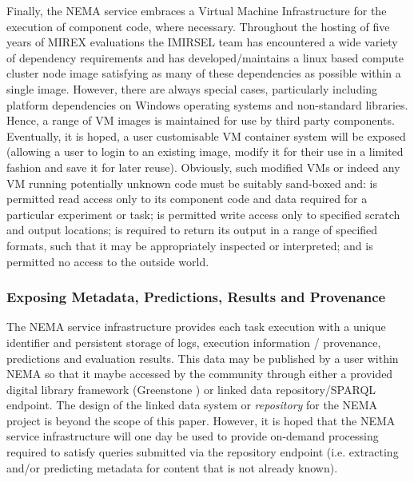 \documentclass[conference]{IEEEtran}
\begin{document}
Finally, the NEMA service embraces a Virtual Machine Infrastructure for the execution of component code, where necessary. Throughout the hosting of five years of MIREX evaluations the IMIRSEL team has encountered a wide variety of dependency requirements and has developed/maintains a linux based compute cluster node image satisfying as many of these dependencies as possible within a single image. However, there are always special cases, particularly including platform dependencies on Windows operating systems and non-standard libraries. Hence, a range of VM images is maintained for use by third party components.
Eventually, it is hoped, a user customisable VM container system will be exposed (allowing a user to login to an existing image, modify it for their use in a limited fashion and save it for later reuse).
Obviously, such modified VMs or indeed any VM running potentially unknown code must be suitably sand-boxed and: is permitted read access only to its component code and data required for a particular experiment or task; is permitted write access only to specified scratch and output locations; is required to return its output in a range of specified formats, such that it may be appropriately inspected or interpreted; and is permitted no access to the outside world.

\subsubsection{Exposing Metadata, Predictions, Results and Provenance}
The NEMA service infrastructure provides each task execution with a unique identifier and persistent storage of logs, execution information / provenance, predictions and evaluation results. This data may be published by a user within NEMA so that it maybe accessed by the community through either a provided digital library framework (Greenstone \cite{witten2000greenstone}) or linked data repository/SPARQL endpoint. 
The design of the linked data system or \emph{repository} for the NEMA project is beyond the scope of this paper. However, it is hoped that the NEMA service infrastructure will one day be used to provide on-demand processing required to satisfy queries submitted via the repository endpoint (i.e. extracting and/or predicting metadata for content that is not already known).
\end{document}
